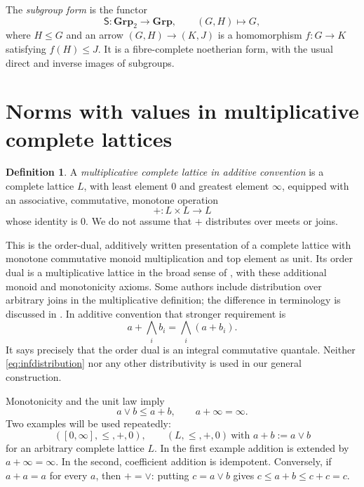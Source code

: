 \documentclass[12pt,a4paper]{amsart}
\theoremstyle{definition}
\newtheorem{definition}[theorem]{Definition}
\newcommand{\Grp}{\mathbf{Grp}}
\begin{document}
The \emph{subgroup form} is the functor
\[
 \mathsf S:\Grp_2\longrightarrow\Grp,\qquad (G,H)\longmapsto G,
\]
where $H\leq G$ and an arrow $(G,H)\to(K,J)$ is a homomorphism $f:G\to K$ satisfying $f(H)\leq J$. It is a fibre-complete noetherian form, with the usual direct and inverse images of subgroups.

\section{Norms with values in multiplicative complete lattices}\label{sec:norms}

\begin{definition}\label{def:coefficient}
A \emph{multiplicative complete lattice in additive convention} is a complete lattice $L$, with least element $0$ and greatest element $\infty$, equipped with an associative, commutative, monotone operation
\[
                         +:L\times L\longrightarrow L
\]
whose identity is $0$. We do not assume that $+$ distributes over meets or joins.
\end{definition}

This is the order-dual, additively written presentation of a complete lattice with monotone commutative monoid multiplication and top element as unit. Its order dual is a multiplicative lattice in the broad sense of \cite{FFJ,Facchini}, with these additional monoid and monotonicity axioms. Some authors include distribution over arbitrary joins in the multiplicative definition; the difference in terminology is discussed in \cite{GD}. In additive convention that stronger requirement is
\begin{equation}\label{eq:infdistribution}
 a+\bigwedge_i b_i=\bigwedge_i(a+b_i).
\end{equation}
It says precisely that the order dual is an integral commutative quantale. Neither \eqref{eq:infdistribution} nor any other distributivity is used in our general construction.

Monotonicity and the unit law imply
\begin{equation}\label{eq:coefficientbounds}
                a\vee b\leq a+b,\qquad a+\infty=\infty.
\end{equation}
Two examples will be used repeatedly:
\[
 ([0,\infty],\leq,+,0),\qquad
 (L,\leq,+,0)\ \text{with }a+b:=a\vee b
\]
for an arbitrary complete lattice $L$. In the first example addition is extended by $a+\infty=\infty$. In the second, coefficient addition is idempotent. Conversely, if $a+a=a$ for every $a$, then $+=\vee$: putting $c=a\vee b$ gives $c\leq a+b\leq c+c=c$.
\end{document}
